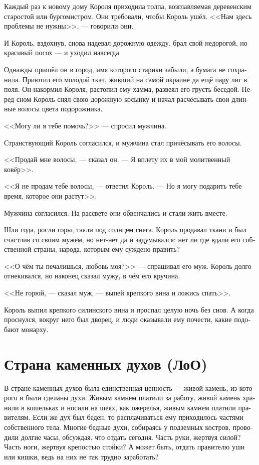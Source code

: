 \documentclass[a4paper,12pt,fleqn]{book}\usepackage{polyglossia}\setdefaultlanguage[babelshorthands=true]{russian}\setotherlanguage{english}\defaultfontfeatures{Ligatures=TeX,Mapping=tex-text}\usepackage{xcolor}\newcommand{\ml}[3]{#2}
\begin{document}
{Каждый раз к новому дому Короля приходила толпа, возглавляемая деревенским старостой или бургомистром.
Они требовали, чтобы Король ушёл.
<<Нам здесь проблемы не нужны>>, --- говорили они.

И Король, вздохнув, снова надевал дорожную одежду, брал свой недорогой, но красивый посох --- и уходил навсегда.

Однажды пришёл он в город, имя которого старики забыли, а бумага не сохранила.
Приютил его молодой ткач, живший на самой окраине да ещё пару лиг в поля.
Он накормил Короля, растопил ему хамма, развеял его грусть беседой.
Перед сном Король снял свою дорожную косынку и начал расчёсывать свои длинные волосы цвета подорожника.

<<Могу ли я тебе помочь?>> --- спросил мужчина.

Странствующий Король согласился, и мужчина стал причёсывать его волосы.

<<Продай мне волосы, --- сказал он.
--- Я вплету их в мой молитвенный ковёр>>.

<<Я не продам тебе волосы, --- ответил Король.
--- Но я могу подарить тебе время, которое они растут>>.

Мужчина согласился.
На рассвете они обвенчались и стали жить вместе.

Шли года, росли горы, таяли под солнцем снега.
Король продавал ткани и был счастлив со своим мужем, но нет-нет да и задумывался: нет ли где вдали его собственной страны, народа, которым ему суждено править?

<<О чём ты печалишься, любовь моя?>> --- спрашивал его муж.
Король долго отнекивался, но наконец сказал мужу, в чём его кручина.

<<Не горюй, --- сказал муж, --- выпей крепкого вина и ложись спать>>.

Король выпил крепкого силинского вина и проспал целую ночь без снов.
А когда проснулся, вокруг него был дворец, и люди оказывали ему почести, какие подобают монарху.

\section{Страна каменных духов (ЛоО)}

В стране каменных духов была единственная ценность --- живой камень, из которого и были сделаны духи.
Живым камнем платили за работу, живой камень хранили в кошельках и носили на шеях, как ожерелья, живым камнем платили правителям.
Если же дух был беден, то расплачиваться ему приходилось частями собственного тела.
Многие бедные духи, собираясь у подземных костров, проводили долгие часы, обсуждая, что отдать сегодня.
Часть руки, жертвуя силой?
Часть ноги, жертвуя крепостью стойки?
А может быть, отдать правителю уши или кишки, ведь на них не так трудно заработать?

}
\end{document}
